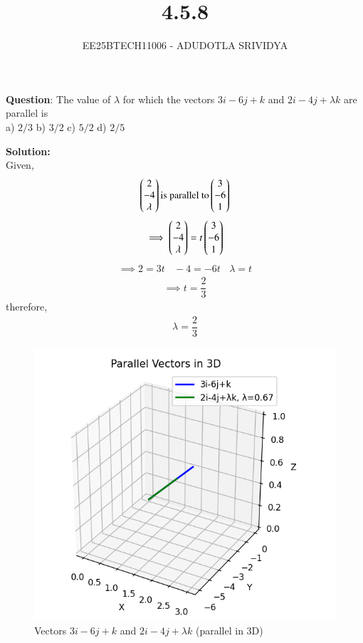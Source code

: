 \documentclass[journal]{IEEEtran}
\begin{document}

\vspace{3cm}

\title{4.5.8}
\author{EE25BTECH11006 - ADUDOTLA SRIVIDYA}
{\let\newpage\relax\maketitle}

\renewcommand{\thefigure}{\theenumi}
\renewcommand{\thetable}{\theenumi}
\setlength{\intextsep}{10pt}

\textbf{Question}: The value of $\lambda$ for which the vectors $3i-6j+k$ and $2i-4j+\lambda k$ are parallel is\\
a) $2/3$ \quad
b) $3/2$ \quad
c) $5/2$ \quad
d) $2/5$ \quad

\textbf{Solution:}\\
Given,
\begin{align}
    \begin{pmatrix}2\\-4\\ \lambda \end{pmatrix} \text{is parallel to}  \begin{pmatrix}3\\-6\\1\end{pmatrix}
\end{align}
\begin{align}
    \implies \begin{pmatrix}2\\-4\\ \lambda \end{pmatrix} = t \begin{pmatrix}3\\-6\\1\end{pmatrix}
\end{align}
\begin{align}
   \implies 2=3t \ \ \ \ -4=-6t \ \ \ \ \lambda = t
\end{align}
\begin{align}
   \implies t=\dfrac{2}{3}
\end{align}
therefore,
\begin{align}
    \lambda = \dfrac{2}{3}
\end{align}

\begin{figure}[H]
    \centering
    \includegraphics[width=0.5\columnwidth]{figs/fig.png}
    \caption{Vectors $3i-6j+k$ and $2i-4j+\lambda k$ (parallel in 3D)}
    \label{fig:Vectors}
\end{figure}
\end{document}
